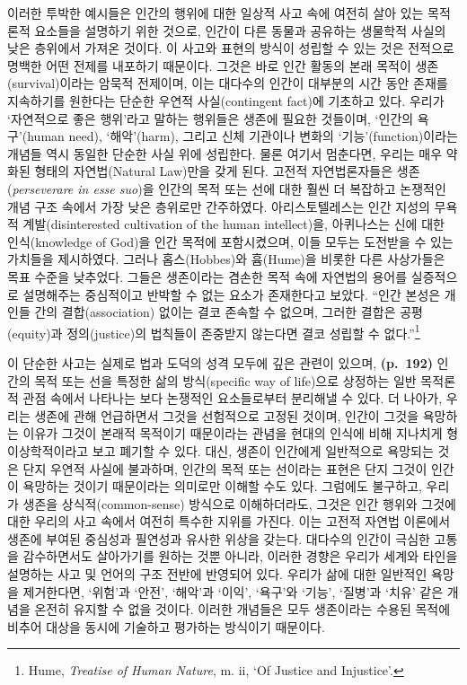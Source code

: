 이러한 투박한 예시들은 인간의 행위에 대한 일상적 사고 속에 여전히 살아
있는 목적론적 요소들을 설명하기 위한 것으로, 인간이 다른 동물과 공유하는
생물학적 사실의 낮은 층위에서 가져온 것이다. 이 사고와 표현의 방식이
성립할 수 있는 것은 전적으로 명백한 어떤 전제를 내포하기 때문이다.
그것은 바로 인간 활동의 본래 목적이 생존(survival)이라는 암묵적
전제이며, 이는 대다수의 인간이 대부분의 시간 동안 존재를 지속하기를
원한다는 단순한 우연적 사실(contingent fact)에 기초하고 있다. 우리가
`자연적으로 좋은 행위'라고 말하는 행위들은 생존에 필요한 것들이며,
`인간의 욕구'(human need), `해악'(harm), 그리고 신체 기관이나 변화의
`기능'(function)이라는 개념들 역시 동일한 단순한 사실 위에 성립한다.
물론 여기서 멈춘다면, 우리는 매우 약화된 형태의 자연법(Natural Law)만을
갖게 된다. 고전적 자연법론자들은 생존(\emph{perseverare in esse suo})을
인간의 목적 또는 선에 대한 훨씬 더 복잡하고 논쟁적인 개념 구조 속에서
가장 낮은 층위로만 간주하였다. 아리스토텔레스는 인간 지성의 무욕적
계발(disinterested cultivation of the human intellect)을, 아퀴나스는
신에 대한 인식(knowledge of God)을 인간 목적에 포함시켰으며, 이들 모두는
도전받을 수 있는 가치들을 제시하였다. 그러나 홉스(Hobbes)와 흄(Hume)을
비롯한 다른 사상가들은 목표 수준을 낮추었다. 그들은 생존이라는 겸손한
목적 속에 자연법의 용어를 실증적으로 설명해주는 중심적이고 반박할 수
없는 요소가 존재한다고 보았다. ``인간 본성은 개인들 간의
결합(association) 없이는 결코 존속할 수 없으며, 그러한 결합은
공평(equity)과 정의(justice)의 법칙들이 존중받지 않는다면 결코 성립할 수
없다.''\footnote{Hume, \emph{Treatise of Human Nature}, m. ii, `Of
  Justice and Injustice'.}

이 단순한 사고는 실제로 법과 도덕의 성격 모두에 깊은 관련이 있으며,
\textbf{(p.~192)} 인간의 목적 또는 선을 특정한 삶의 방식(specific way of
life)으로 상정하는 일반 목적론적 관점 속에서 나타나는 보다 논쟁적인
요소들로부터 분리해낼 수 있다. 더 나아가, 우리는 생존에 관해 언급하면서
그것을 선험적으로 고정된 것이며, 인간이 그것을 욕망하는 이유가 그것이
본래적 목적이기 때문이라는 관념을 현대의 인식에 비해 지나치게
형이상학적이라고 보고 폐기할 수 있다. 대신, 생존이 인간에게 일반적으로
욕망되는 것은 단지 우연적 사실에 불과하며, 인간의 목적 또는 선이라는
표현은 단지 그것이 인간이 욕망하는 것이기 때문이라는 의미로만 이해할
수도 있다. 그럼에도 불구하고, 우리가 생존을 상식적(common-sense)
방식으로 이해하더라도, 그것은 인간 행위와 그것에 대한 우리의 사고 속에서
여전히 특수한 지위를 가진다. 이는 고전적 자연법 이론에서 생존에 부여된
중심성과 필연성과 유사한 위상을 갖는다. 대다수의 인간이 극심한 고통을
감수하면서도 살아가기를 원하는 것뿐 아니라, 이러한 경향은 우리가 세계와
타인을 설명하는 사고 및 언어의 구조 전반에 반영되어 있다. 우리가 삶에
대한 일반적인 욕망을 제거한다면, `위험'과 `안전', `해악'과 `이익',
`욕구'와 `기능', `질병'과 `치유' 같은 개념을 온전히 유지할 수 없을
것이다. 이러한 개념들은 모두 생존이라는 수용된 목적에 비추어 대상을
동시에 기술하고 평가하는 방식이기 때문이다.


